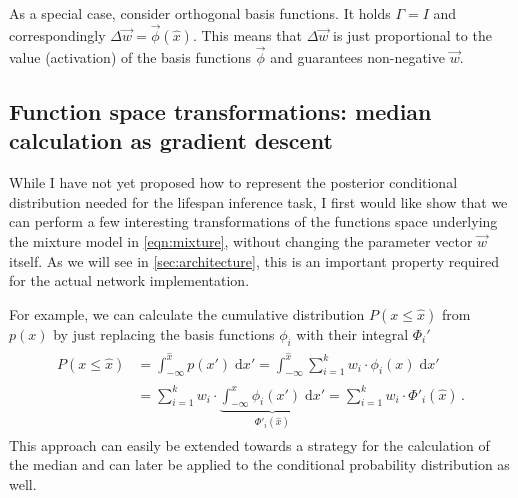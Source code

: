 \documentclass[a4paper,11pt]{article}
\begin{document}
As a special case, consider orthogonal basis functions. It holds $\Gamma = I$ and correspondingly $\Delta \vec w = \vec \phi(\hat x)$. This means that $\Delta \vec w$ is just proportional to the value (activation) of the basis functions $\vec \phi$ and guarantees non-negative $\vec w$.

\subsection{Function space transformations: median calculation as gradient descent}

While I have not yet proposed how to represent the posterior conditional distribution needed for the lifespan inference task, I first would like show that we can perform a few interesting transformations of the functions space underlying the mixture model in \cref{eqn:mixture}, without changing the parameter vector $\vec w$ itself. As we will see in \cref{sec:architecture}, this is an important property required for the actual network implementation.

For example, we can calculate the cumulative distribution $P(x \leq \hat x)$ from $p(x)$ by just replacing the basis functions $\phi_i$ with their integral $\Phi_i'$
\begin{align}
	\begin{aligned}
    P(x \leq \hat x)
    &= \int_{-\infty}^{\hat{x}} p(x') \; \mathrm{d}x'
     = \int_{-\infty}^{\hat{x}} \sum_{i=1}^k w_i \cdot \phi_i(x) \; \mathrm{d}x' \\
    &= \sum_{i=1}^k w_i \cdot \underbrace{\int_{-\infty}^{\hat{x}} \phi_i(x') \;  \mathrm{d}x'}_{\Phi'_i(\hat x)}
     = \sum_{i=1}^k w_i \cdot \Phi'_i(\hat x) \,.
	\end{aligned}
    \label{eqn:cumulative_distribution}
\end{align}
This approach can easily be extended towards a strategy for the calculation of the median and can later be applied to the conditional probability distribution as well.
\end{document}
